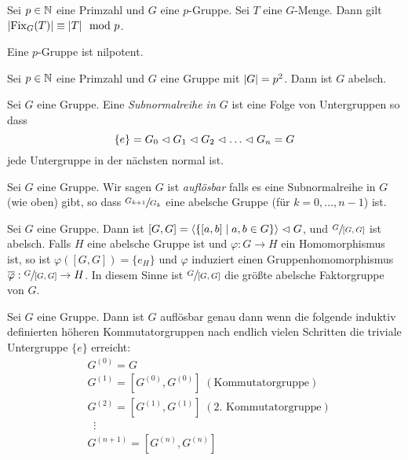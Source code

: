 \begin{lemma}
	Sei $p \in \mathbb{N}$ eine Primzahl und $G$ eine $p$-Gruppe.
	Sei $T$ eine $G$-Menge. Dann gilt $\abs{\operatorname{Fix}_{G}(T)} \equiv \abs{T} \mod p$.
\end{lemma}


\begin{theorem}
	Eine $p$-Gruppe ist nilpotent.
\end{theorem}


\begin{corollary}
	Sei $p \in \mathbb{N}$ eine Primzahl und $G$ eine Gruppe mit $\abs{G} = p^2$.
	Dann ist $G$ abelsch.
\end{corollary}


\begin{definition}
	Sei $G$ eine Gruppe. Eine \emph{Subnormalreihe in $G$} ist eine Folge von Untergruppen so dass
	 \[
		 \{e\} = G_0 \vartriangleleft G_1 \vartriangleleft G_2 \vartriangleleft \ldots \vartriangleleft G_{n} = G
	\] 
	jede Untergruppe in der nächsten normal ist.
\end{definition}

\begin{definition}
	Sei $G$ eine Gruppe. Wir sagen $G$ ist \emph{auflösbar} falls es eine Subnormalreihe in $G$ (wie oben) gibt, so dass
	$\sfrac{G_{k+1}}{G_{k}}$ eine abelsche Gruppe (für $k = 0, \ldots, n-1$) ist.
\end{definition}


\begin{proposition}
	Sei $G$ eine Gruppe. Dann ist $[G,G] = \left< \{ [a,b] \mid a,b \in G \} \right> \vartriangleleft G$, und $\sfrac{G}{[G,G]}$ ist abelsch.
	Falls $H$ eine abelsche Gruppe ist und $\varphi: G \to H$ ein Homomorphismus ist, so ist $\varphi([G,G]) = \{e_{H}\}$
	und $\varphi$ induziert einen Gruppenhomomorphismus $\overline{\varphi}: \sfrac{G}{[G,G]} \to H$.
	In diesem Sinne ist $\sfrac{G}{[G,G]}$ die größte abelsche Faktorgruppe von $G$.
\end{proposition}


\begin{proposition}
	Sei $G$ eine Gruppe. Dann ist $G$ auflösbar genau dann wenn die folgende induktiv definierten
	höheren Kommutatorgruppen nach endlich vielen Schritten die triviale Untergruppe $\{e\}$ erreicht:
	\begin{align*}
		&G^{(0)} = G \\
		&G^{(1)} = [G^{(0)}, G^{(0)}] \;(\text{Kommutatorgruppe})\\
		&G^{(2)} = [G^{(1)}, G^{(1)}] \;(\text{2. Kommutatorgruppe})\\
		&\;\;\vdots \\
		&G^{(n+1)} = [G^{(n)}, G^{(n)}]
	\end{align*}
\end{proposition}


